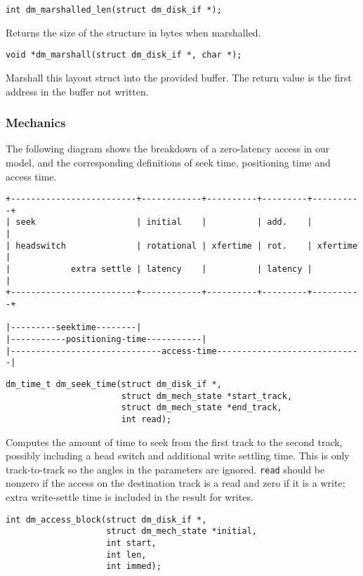 \begin{verbatim}
int dm_marshalled_len(struct dm_disk_if *);
\end{verbatim}

Returns the size of the structure in bytes when marshalled.


\begin{verbatim}
void *dm_marshall(struct dm_disk_if *, char *);
\end{verbatim}

Marshall this layout struct into the provided buffer.  The return value is
the first address in the buffer not written.


\subsubsection{Mechanics}

The following diagram shows the breakdown of a zero-latency access in
our model, and the corresponding definitions of seek time, positioning
time and access time.

\begin{verbatim}
+-------------------------+------------+----------+---------+----------+
| seek                    | initial    |          | add.    |          |
| headswitch              | rotational | xfertime | rot.    | xfertime |
|            extra settle | latency    |          | latency |          |
+-------------------------+------------+----------+---------+----------+

|---------seektime--------|
|-----------positioning-time-----------|
|------------------------------access-time-----------------------------|
\end{verbatim}

\begin{verbatim}
dm_time_t dm_seek_time(struct dm_disk_if *, 
                       struct dm_mech_state *start_track,
                       struct dm_mech_state *end_track,
                       int read);
\end{verbatim}

Computes the amount of time to seek from the first track to the second
track, possibly including a head switch and additional write settling
time.  This is only track-to-track so the angles in the parameters are
ignored.  \texttt{read} should be nonzero if the access on the destination
track is a read and zero if it is a write; extra write-settle time is
included in the result for writes.

\begin{verbatim}
int dm_access_block(struct dm_disk_if *,
                    struct dm_mech_state *initial,
                    int start,
                    int len,
                    int immed);
\end{verbatim}


